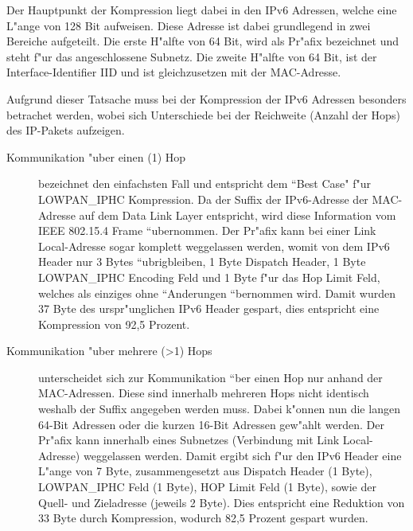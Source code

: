 \documentclass[final]{lktseminar}
\begin{document}
Der Hauptpunkt der Kompression liegt dabei in den IPv6 Adressen\cite{rfc4291}, welche eine L"ange von 128 Bit aufweisen. Diese
Adresse ist dabei grundlegend in zwei Bereiche aufgeteilt. Die erste H"alfte von 64 Bit, wird als Pr"afix bezeichnet und
steht f"ur das angeschlossene Subnetz. Die zweite H"alfte von 64 Bit, ist der Interface-Identifier IID und ist
gleichzusetzen mit der MAC-Adresse.

Aufgrund dieser Tatsache muss bei der Kompression der IPv6 Adressen besonders betrachet werden, wobei sich Unterschiede
bei der Reichweite (Anzahl der Hops) des IP-Pakets aufzeigen.

\begin{description}
    \item[Kommunikation "uber einen (1) Hop] bezeichnet den einfachsten Fall und entspricht dem ``Best Case" f"ur
    LOWPAN\_IPHC Kompression. Da der Suffix der IPv6-Adresse der MAC-Adresse auf dem Data Link Layer entspricht, wird
    diese Information vom IEEE 802.15.4 Frame ``ubernommen. Der Pr"afix kann bei einer Link Local-Adresse sogar komplett
    weggelassen werden, womit von dem IPv6 Header nur 3 Bytes ``ubrigbleiben, 1 Byte Dispatch Header, 1 Byte LOWPAN\_IPHC Encoding Feld
    und 1 Byte f"ur das Hop Limit Feld, welches als einziges ohne ``Anderungen ``bernommen wird. Damit wurden 37 Byte des
    urspr"unglichen IPv6 Header gespart, dies entspricht eine Kompression von 92,5 Prozent.

    \item[Kommunikation "uber mehrere (\textgreater 1) Hops] unterscheidet sich zur Kommunikation ``ber einen Hop nur anhand der MAC-Adressen.
    Diese sind innerhalb mehreren Hops nicht identisch weshalb der Suffix angegeben werden muss. Dabei k"onnen nun die langen 64-Bit Adressen oder die
    kurzen 16-Bit Adressen gew"ahlt werden. Der Pr"afix kann innerhalb eines Subnetzes (Verbindung mit Link Local-Adresse) weggelassen werden.
    Damit ergibt sich f"ur den IPv6 Header eine L"ange von 7 Byte, zusammengesetzt aus Dispatch Header (1 Byte), LOWPAN\_IPHC Feld (1 Byte),
    HOP Limit Feld (1 Byte), sowie der Quell- und Zieladresse (jeweils 2 Byte). Dies entspricht eine Reduktion von 33 Byte durch
    Kompression, wodurch 82,5 Prozent gespart wurden.
\end{description}
\end{document}
